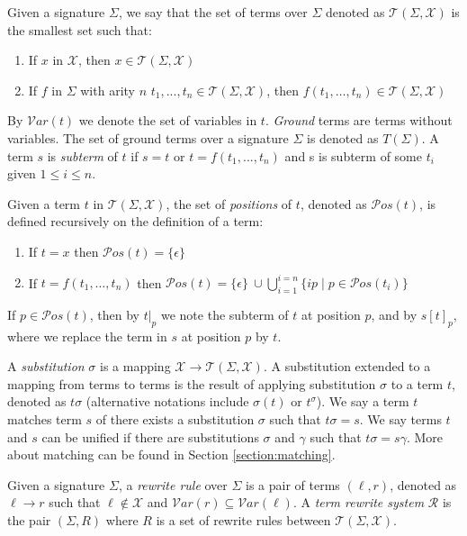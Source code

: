 \documentclass{report}
\theoremstyle{definition}
\begin{document}
Given a signature $\Sigma$, we say that the set of terms over $\Sigma$ denoted as $\mathcal{T}(\Sigma, \mathcal{X})$ is the smallest set such that:
\begin{enumerate}
    \item If $x$ in $\mathcal{X}$, then $x \in \mathcal{T}(\Sigma, \mathcal{X})$
    \item If $f$ in $\Sigma$ with arity $n$ $t_1, ..., t_n \in \mathcal{T}(\Sigma, \mathcal{X})$, then $f(t_1, \dots, t_n) \in \mathcal{T}(\Sigma, \mathcal{X})$
\end{enumerate}

By $\mathcal{V}ar(t)$ we denote the set of variables in $t$. \textit{Ground} terms are terms without variables. The set of ground terms over a signature $\Sigma$ is denoted as $T(\Sigma)$. A term $s$ is \textit{subterm} of $t$ if $s = t$ or $t = f(t_1, ..., t_n)$ and s is subterm of some $t_i$ given $1 \leq i \leq n$. 

Given a term $t$ in $\mathcal{T}(\Sigma, \mathcal{X})$, the set of \textit{positions} of $t$, denoted as $\mathcal{P}os(t)$, is defined recursively on the definition of a term:
\begin{enumerate}
    \item If $t = x$ then $\mathcal{P}os(t) = \{\epsilon\}$
    \item If $t = f(t_1, \dots, t_n)$ then $\mathcal{P}os(t) = \{\epsilon\}\ \cup \bigcup_{i=1}^{i=n} \{ip \mid p \in \mathcal{P}os(t_i)\}$
\end{enumerate}

If $p \in \mathcal{P}os(t)$, then by $t|_p$ we note the subterm of $t$ at position $p$, and by $s[t]_p$, where we replace the term in $s$ at position $p$ by $t$.

A \textit{substitution} $\sigma$ is a mapping $\mathcal{X} \rightarrow \mathcal{T}(\Sigma, \mathcal{X})$. A substitution extended to a mapping from terms to terms is the result of applying substitution $\sigma$ to a term $t$, denoted as $t\sigma$ (alternative notations include $\sigma(t)$ or $t^\sigma$). We say a term $t$ matches term $s$ of there exists a substitution $\sigma$ such that $t\sigma = s$. We say terms $t$ and $s$ can be unified if there are substitutions $\sigma$ and $\gamma$ such that $t\sigma = s\gamma$. More about matching can be found in Section \ref{section:matching}.

Given a signature $\Sigma$, a \textit{rewrite rule} over $\Sigma$ is a pair of terms $(\ell, r)$, denoted as $\ell \rightarrow r$ such that $\ell \notin \mathcal{X}$ and $\mathcal{V}ar(r) \subseteq \mathcal{V}ar(\ell)$. A \textit{term rewrite system} $\mathcal{R}$ is the pair $(\Sigma, R)$ where $R$ is a set of rewrite rules between $\mathcal{T}(\Sigma, \mathcal{X})$. 
\end{document}
